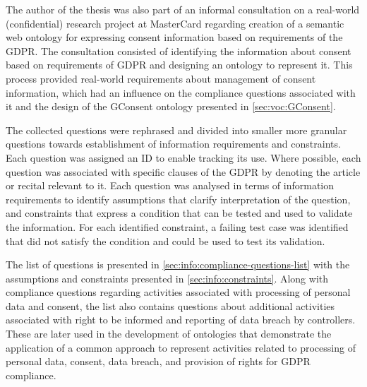 The author of the thesis was also part of an informal consultation on a real-world (confidential) research project at MasterCard regarding creation of a semantic web ontology for expressing consent information based on requirements of the GDPR.
The consultation consisted of identifying the information about consent based on requirements of GDPR and designing an ontology to represent it. 
This process provided real-world requirements about management of consent information, which had an influence on the compliance questions associated with it and the design of the GConsent ontology presented in \autoref{sec:voc:GConsent}.

The collected questions were rephrased and divided into smaller more granular questions towards establishment of information requirements and constraints. 
Each question was assigned an ID to enable tracking its use.
Where possible, each question was associated with specific clauses of the GDPR by denoting the article or recital relevant to it. Each question was analysed in terms of information requirements to identify assumptions that clarify interpretation of the question, and constraints that express a condition that can be tested and used to validate the information. For each identified constraint, a failing test case was identified that did not satisfy the condition and could be used to test its validation.

The list of questions is presented in \autoref{sec:info:compliance-questions-list} with the assumptions and constraints presented in \autoref{sec:info:constraints}. Along with compliance questions regarding activities associated with processing of personal data and consent, the list also contains questions about additional activities associated with right to be informed and reporting of data breach by controllers. These are later used in the development of ontologies that demonstrate the application of a common approach to represent activities related to processing of personal data, consent, data breach, and provision of rights for GDPR compliance. 

